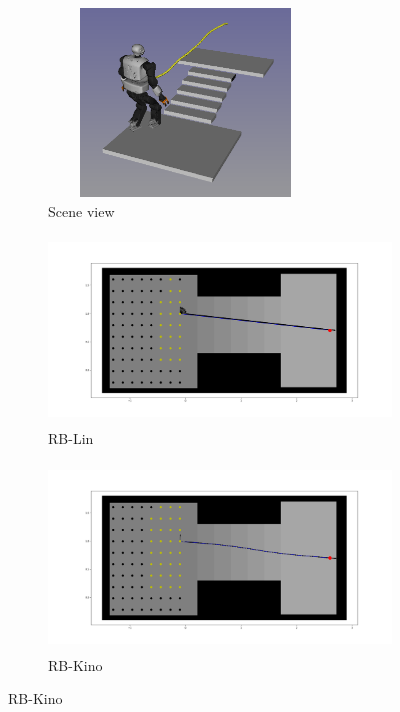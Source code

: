 \begin{figure}[ht]
    \centering
    \captionsetup[subfigure]{justification=centering}
    \begin{subfigure}[t]{0.49\linewidth}
    \centering
    \includegraphics[width=0.8\textwidth, height=5cm]{Figures/Chapter_LEAS/stairs_exemple.png}
    \caption{Scene view}
    \end{subfigure}
    \begin{subfigure}[t]{0.49\linewidth}
    \includegraphics[width=\textwidth, height=5cm,trim={2cm 2cm 2cm 2cm},clip]{Figures/Chapter_LEAS/stairs_lin_p1_90.png}
    \caption{RB-Lin}
    \label{fig:leas:stairs_p1_lin}
    \end{subfigure}
    \begin{subfigure}[t]{0.49\linewidth}
    \includegraphics[width=\textwidth, height=5cm,trim={2cm 2cm 2cm 2cm},clip]{Figures/Chapter_LEAS/stairs_kino_p1_90.png}
    \caption{RB-Kino}
    \label{fig:leas:stairs_p1_kino}
    \end{subfigure}

\end{figure}
